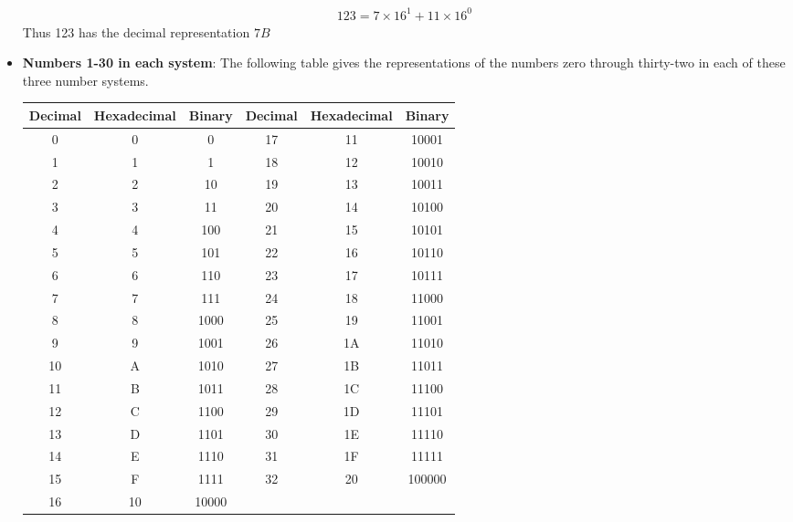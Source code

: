 \documentclass{report}
\begin{document}
\begin{itemize}
            \begin{align*}
                123 = 7 \times 16^{1} + 11\times 16^{0}
            \end{align*}
            Thus 123 has the decimal representation $7B $
        \item \textbf{Numbers 1-30 in each system}: The following table gives the representations of the numbers zero through thirty-two 
            in each of these three number systems.
            \begin{center}
                \begin{tabular}{|c|c|c|c|c|c|}
                    \hline
                    \textbf{Decimal} & \textbf{Hexadecimal} & \textbf{Binary} & \textbf{Decimal} & \textbf{Hexadecimal} & \textbf{Binary} \\ \hline
                    0 & 0 & 0 & 17 & 11 & 10001 \\ \hline
                    1 & 1 & 1 & 18 & 12 & 10010 \\ \hline
                    2 & 2 & 10 & 19 & 13 & 10011 \\ \hline
                    3 & 3 & 11 & 20 & 14 & 10100 \\ \hline
                    4 & 4 & 100 & 21 & 15 & 10101 \\ \hline
                    5 & 5 & 101 & 22 & 16 & 10110 \\ \hline
                    6 & 6 & 110 & 23 & 17 & 10111 \\ \hline
                    7 & 7 & 111 & 24 & 18 & 11000 \\ \hline
                    8 & 8 & 1000 & 25 & 19 & 11001 \\ \hline
                    9 & 9 & 1001 & 26 & 1A & 11010 \\ \hline
                    10 & A & 1010 & 27 & 1B & 11011 \\ \hline
                    11 & B & 1011 & 28 & 1C & 11100 \\ \hline
                    12 & C & 1100 & 29 & 1D & 11101 \\ \hline
                    13 & D & 1101 & 30 & 1E & 11110 \\ \hline
                    14 & E & 1110 & 31 & 1F & 11111 \\ \hline
                    15 & F & 1111 & 32 & 20 & 100000 \\ \hline
                    16 & 10 & 10000 & & & \\ \hline
                \end{tabular}

\end{center}
\end{itemize}
\end{document}
